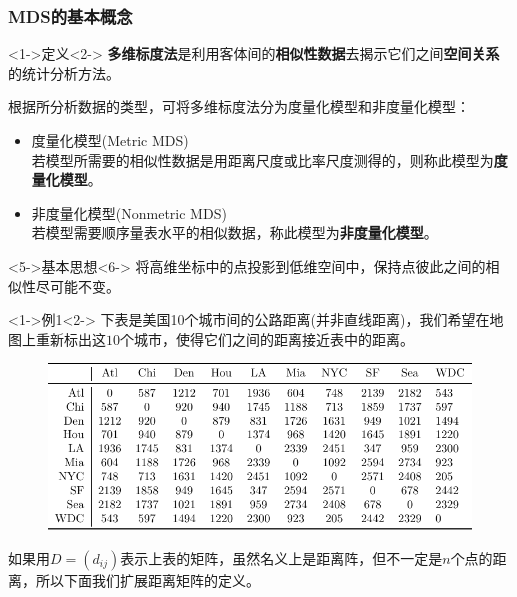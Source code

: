 \documentclass[UTF8, compress]{ctexbeamer}
\begin{document}
	\begin{frame}
	\frametitle{\heiti \textsf{MDS}的基本概念}
	
		\begin{block}<1->{\heiti 定义}<2->
			\textbf{多维标度法}是利用客体间的\textbf{相似性数据}去揭示它们之间\textbf{空间关系}的统计分析方法。
		\end{block}

		
		根据所分析数据的类型，可将多维标度法分为度量化模型和非度量化模型：

		\begin{itemize}
			\item<4-> 度量化模型(Metric MDS) \\

			若模型所需要的相似性数据是用\alert{距离尺度}或\alert{比率尺度}测得的，则称此模型为\textbf{度量化模型}。
			
			\vspace{0.25cm}
			
			\item<5->非度量化模型(Nonmetric MDS) \\ 

			若模型需要\alert{顺序量表水平}的相似数据，称此模型为\textbf{非度量化模型}。
		\end{itemize}
	
		\begin{block}<5->{\heiti 基本思想}<6->
			将高维坐标中的点投影到低维空间中，保持点彼此之间的相似性尽可能不变。
		\end{block}
	
	\end{frame}


	\begin{frame}
		\begin{exampleblock}<1->{\heiti 例1}<2->
			下表是美国10个城市间的公路距离(并非直线距离)，我们希望在地图上重新标出这$10$个城市，使得它们之间的距离接近表中的距离。
			\begin{figure}
				\centering
				\includegraphics[width=1\linewidth]{figures/tabular1}
			\end{figure}
		\end{exampleblock}
	
		\onslide<3-> 
		如果用$D=(d_{ij})$表示上表的矩阵，虽然名义上是距离阵，但不一定是$n$个点的距离，所以下面我们扩展距离矩阵的定义。
	
	\end{frame}
\end{document}
